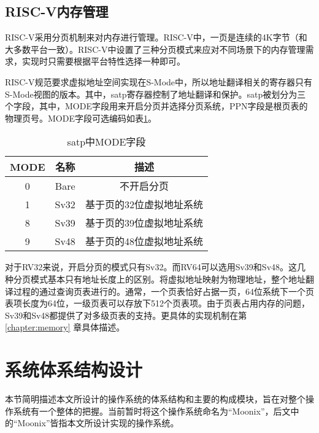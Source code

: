 \subsection{RISC-V内存管理}

RISC-V采用分页机制来对内存进行管理。RISC-V中，一页是连续的4K字节（和大多数平台一致）。RISC-V中设置了三种分页模式来应对不同场景下的内存管理需求，实现时只需要根据平台特性选择一种即可。

RISC-V规范要求虚拟地址空间实现在S-Mode中，所以地址翻译相关的寄存器只有S-Mode视图的版本。其中，satp寄存器控制了地址翻译和保护。satp被划分为三个字段，其中，MODE字段用来开启分页并选择分页系统，PPN字段是根页表的物理页号。MODE字段可选编码如表\ref{tab:satpmode}。

\begin{table}[h]
	\centering
	\setlength{\belowcaptionskip}{2pt}
	\caption{satp中MODE字段}
	\label{tab:satpmode}
	\begin{tabular}{ccc}
		\hline
		MODE             & 名称       & 描述                                        \\ \hline
		0                & Bare       & 不开启分页                                   \\ 
		1                & Sv32       & 基于页的32位虚拟地址系统                      \\ 
		8                & Sv39       & 基于页的39位虚拟地址系统                      \\ 
		9                & Sv48       & 基于页的48位虚拟地址系统                      \\ \hline
	\end{tabular}
\end{table}

对于RV32来说，开启分页的模式只有Sv32。而RV64可以选用Sv39和Sv48。这几种分页模式基本只有地址长度上的区别。将虚拟地址映射为物理地址，整个地址翻译过程的通过查询页表进行的。通常，一个页表恰好占据一页，64位系统下一个页表项长度为64位，一级页表可以存放下512个页表项。由于页表占用内存的问题，Sv39和Sv48都提供了对多级页表的支持。更具体的实现机制在第 \ref{chapter:memory} 章具体描述。

\section{系统体系结构设计}

本节简明描述本文所设计的操作系统的体系结构和主要的构成模块，旨在对整个操作系统有一个整体的把握。当前暂时将这个操作系统命名为“Moonix”，后文中的“Moonix”皆指本文所设计实现的操作系统。

